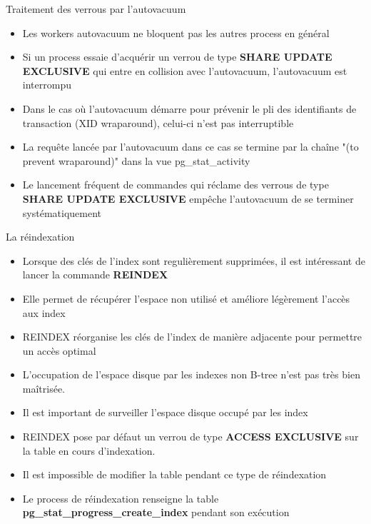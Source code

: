 \begin{frame}{Traitement des verrous par l'autovacuum}

\begin{itemize}
   \item Les workers autovacuum ne bloquent pas les autres process en général
   \item Si un process essaie d'acquérir un verrou de type \textbf{SHARE UPDATE EXCLUSIVE} qui entre en collision avec l'autovacuum, l'autovacuum est interrompu
   \item Dans le cas où l'autovacuum démarre pour prévenir le pli des identifiants de transaction (XID wraparound), celui-ci n'est pas interruptible
   \item La requête lancée par l'autovacuum dans ce cas se termine par la chaîne "(to prevent wraparound)" dans la vue pg\_stat\_activity
   \item Le lancement fréquent de commandes qui réclame des verrous de type \textbf{SHARE UPDATE EXCLUSIVE} empêche l'autovacuum de se terminer systématiquement
\end{itemize}

\end{frame}


\begin{frame}{La réindexation}

\begin{itemize}
   \item Lorsque des clés de l'index sont regulièrement supprimées, il est intéressant de lancer la commande \textbf{REINDEX}
   \item Elle permet de récupérer l'espace non utilisé et améliore légèrement l'accès aux index
   \item REINDEX réorganise les clés de l'index de manière adjacente pour permettre un accès optimal
   \item L'occupation de l'espace disque par les indexes non B-tree n'est pas très bien maîtrisée.
   \item Il est important de surveiller l'espace disque occupé par les index
   \item REINDEX pose par défaut un verrou de type \textbf{ACCESS EXCLUSIVE} sur la table en cours d'indexation.
   \item Il est impossible de modifier la table pendant ce type de réindexation
   \item Le process de réindexation renseigne la table \textbf{pg\_stat\_progress\_create\_index} pendant son exécution

\end{itemize}

\begin{toile}
\end{toile}

\end{frame}

